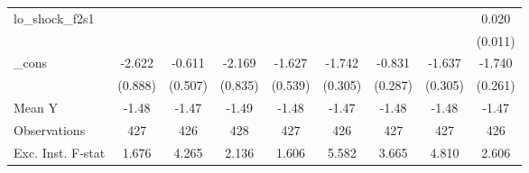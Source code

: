 {\begin{tabular}{l*{8}{c}}
\addlinespace
lo\_shock\_f2s1&                     &                     &                     &                     &                     &                     &                     &       0.020\sym{*}  \\
            &                     &                     &                     &                     &                     &                     &                     &     (0.011)         \\
\addlinespace
\_cons      &      -2.622\sym{***}&      -0.611         &      -2.169\sym{**} &      -1.627\sym{***}&      -1.742\sym{***}&      -0.831\sym{***}&      -1.637\sym{***}&      -1.740\sym{***}\\
            &     (0.888)         &     (0.507)         &     (0.835)         &     (0.539)         &     (0.305)         &     (0.287)         &     (0.305)         &     (0.261)         \\
\midrule
Mean Y      &       -1.48         &       -1.47         &       -1.49         &       -1.48         &       -1.47         &       -1.48         &       -1.48         &       -1.47         \\
Observations&         427         &         426         &         428         &         427         &         426         &         427         &         427         &         426         \\
Exc. Inst. F-stat&       1.676         &       4.265         &       2.136         &       1.606         &       5.582         &       3.665         &       4.810         &       2.606         \\
\bottomrule
\end{tabular}
}
